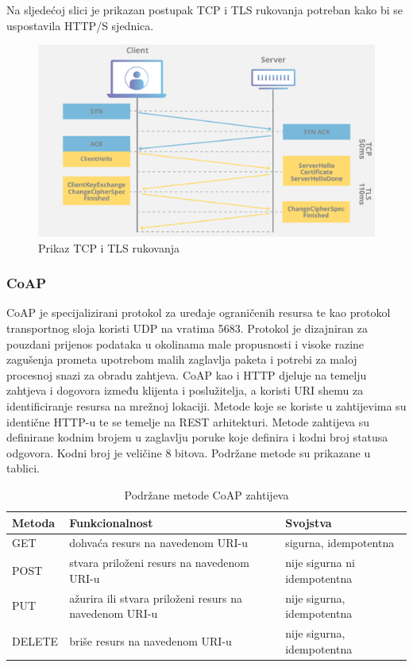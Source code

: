 \documentclass[times, utf8, diplomski]{fer}
\begin{document}
Na sljedećoj slici je prikazan postupak TCP i TLS rukovanja potreban kako bi se uspostavila HTTP/S sjednica.
\begin{figure}[htb]
    \centering
    \includegraphics[width=14.5cm]{images/tls.png}
    \caption{Prikaz TCP i TLS rukovanja\citep{TLS}}
    \label{fig:tls}
\end{figure}

\subsubsection{CoAP}
CoAP \citep{COAP} je specijalizirani protokol za uređaje ograničenih resursa te kao protokol transportnog sloja koristi UDP na vratima 5683. Protokol je dizajniran za pouzdani prijenos podataka u okolinama male propusnosti i visoke razine zagušenja prometa upotrebom malih zaglavlja paketa i potrebi za maloj procesnoj snazi za obradu zahtjeva. CoAP kao i HTTP djeluje na temelju zahtjeva i dogovora između klijenta i poslužitelja, a koristi URI shemu za identificiranje resursa na mrežnoj lokaciji. Metode koje se koriste u zahtijevima su identične HTTP-u te se temelje na REST  arhitekturi. Metode zahtijeva su definirane kodnim brojem u zaglavlju poruke koje definira i kodni broj statusa odgovora. Kodni broj je veličine 8 bitova. Podržane metode su prikazane u tablici.
\begin{table}[H]
    \centering
    \caption{Podržane metode CoAP zahtijeva}
    \begin{tabular}{| L | L | M |} 
    \hline
    \textbf{Metoda} & \textbf{Funkcionalnost} & \textbf{Svojstva}\\
    \hline\hline
    GET & dohvaća resurs na navedenom URI-u & sigurna, idempotentna \\
    \hline
    POST & stvara priloženi resurs na navedenom URI-u & nije sigurna ni idempotentna \\ 
    \hline
    PUT & ažurira ili stvara priloženi resurs na navedenom URI-u & nije sigurna, idempotentna \\ 
    \hline
    DELETE & briše resurs na navedenom URI-u & nije sigurna, idempotentna \\ 
    \hline
    \end{tabular}
    \label{tab:coap}
\end{table} 
\end{document}
